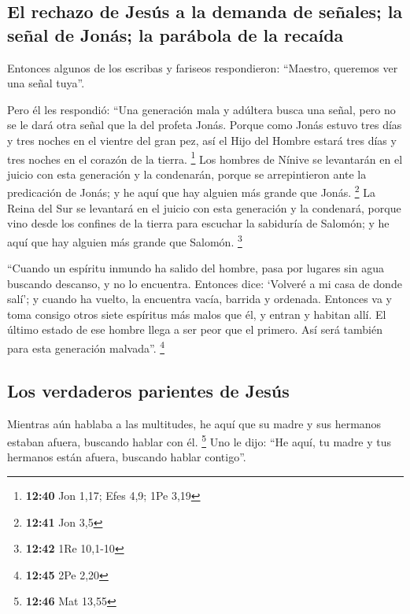 \begin{paracol}{2}
\hypertarget{el-rechazo-de-jesuxfas-a-la-demanda-de-seuxf1ales-la-seuxf1al-de-jonuxe1s-la-paruxe1bola-de-la-recauxedda}{%
\subsection{El rechazo de Jesús a la demanda de señales; la señal de
Jonás; la parábola de la
recaída}\label{el-rechazo-de-jesuxfas-a-la-demanda-de-seuxf1ales-la-seuxf1al-de-jonuxe1s-la-paruxe1bola-de-la-recauxedda}}

 Entonces algunos de los escribas y fariseos
respondieron: ``Maestro, queremos ver una señal tuya''.

 Pero él les respondió: ``Una generación mala y adúltera
busca una señal, pero no se le dará otra señal que la del profeta Jonás.
 Porque como Jonás estuvo tres días y tres noches en el
vientre del gran pez, así el Hijo del Hombre estará tres días y tres
noches en el corazón de la tierra. \footnote{\textbf{12:40} Jon 1,17;
  Efes 4,9; 1Pe 3,19}  Los hombres de Nínive se
levantarán en el juicio con esta generación y la condenarán, porque se
arrepintieron ante la predicación de Jonás; y he aquí que hay alguien
más grande que Jonás. \footnote{\textbf{12:41} Jon 3,5} 
La Reina del Sur se levantará en el juicio con esta generación y la
condenará, porque vino desde los confines de la tierra para escuchar la
sabiduría de Salomón; y he aquí que hay alguien más grande que Salomón.
\footnote{\textbf{12:42} 1Re 10,1-10}

 ``Cuando un espíritu inmundo ha salido del hombre, pasa
por lugares sin agua buscando descanso, y no lo encuentra.
 Entonces dice: `Volveré a mi casa de donde salí'; y
cuando ha vuelto, la encuentra vacía, barrida y ordenada.
 Entonces va y toma consigo otros siete espíritus más
malos que él, y entran y habitan allí. El último estado de ese hombre
llega a ser peor que el primero. Así será también para esta generación
malvada''. \footnote{\textbf{12:45} 2Pe 2,20}

\hypertarget{los-verdaderos-parientes-de-jesuxfas}{%
\subsection{Los verdaderos parientes de
Jesús}\label{los-verdaderos-parientes-de-jesuxfas}}

 Mientras aún hablaba a las multitudes, he aquí que su
madre y sus hermanos estaban afuera, buscando hablar con él. \footnote{\textbf{12:46}
  Mat 13,55}  Uno le dijo: ``He aquí, tu madre y tus
hermanos están afuera, buscando hablar contigo''.


\end{paracol}
